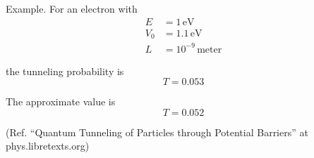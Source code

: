 Example. For an electron with
\begin{align*}
E&=1\,\text{eV}
\\
V_0&=1.1\,\text{eV}
\\
L&=10^{-9}\,\text{meter}
\end{align*}

the tunneling probability is
\begin{equation*}
T=0.053
\end{equation*}

The approximate value is
\begin{equation*}
T=0.052
\end{equation*}

(Ref. ``Quantum Tunneling of Particles through Potential Barriers''
at phys.libretexts.org)


